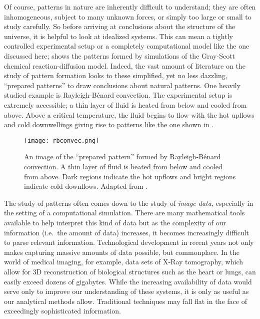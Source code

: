 	Of course, patterns in nature are inherently difficult to understand; they are often inhomogeneous, subject to many unknown forces, or simply too large or small to study carefully. So before arriving at conclusions about the structure of the universe, it is helpful to look at idealized systems. This can mean a tightly controlled experimental setup or a completely computational model like the one discussed here;  shows the patterns formed by simulations of the Gray-Scott chemical reaction-diffusion model. Indeed, the vast amount of literature on the study of pattern formation looks to these simplified, yet no less dazzling, ``prepared patterns'' to draw conclusions about natural patterns. One heavily studied example is Rayleigh-B\'{e}nard convection. The experimental setup is extremely accessible; a thin layer of fluid is heated from below and cooled from above. Above a critical temperature, the fluid begins to flow with the hot upflows and cold downwellings giving rise to patterns like the one shown in .
%
\begin{figure}[h]
	\centering
	\texttt{[image: rbconvec.png]}
	\caption{An image of the ``prepared pattern'' formed by Rayleigh-B\'{e}nard convection. A thin layer of fluid is heated from below and cooled from above. Dark regions indicate the hot upflows and bright regions indicate cold downflows. Adapted from \protect{}.}
	\label{fig:rbconvec}
\end{figure}
%

	The study of patterns often comes down to the study of \textit{image data}, especially in the setting of a computational simulation. There are many mathematical tools available to help interpret this kind of data but as the complexity of our information (i.e.\ the amount of data) increases, it becomes increasingly difficult to parse relevant information.  Technological development in recent years not only makes capturing massive amounts of data possible, but commonplace. In the world of medical imaging, for example, data sets of X-Ray tomography, which allow for 3D reconstruction of biological structures such as the heart or lungs, can easily exceed dozens of gigabytes. While the increasing availability of data would serve only to improve our understanding of these systems, it is only as useful as our analytical methods allow. Traditional techniques may fall flat in the face of exceedingly sophisticated information.
	

